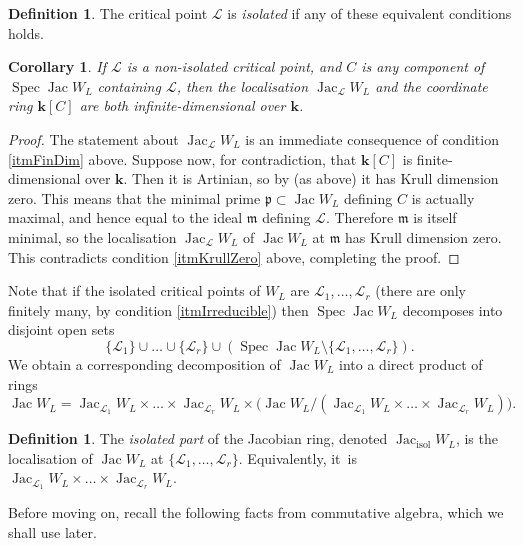 \documentclass[JEP,XML,SOM,Unicode,NoEqCountersInSection,NoFloatCountersInSection,published]{cedram}
\newtheorem{corollary}[theorem]{Corollary}
\theoremstyle{definition}
\newtheorem{definition}[theorem]{Definition}
\newcommand{\calL}{\mathcal{L}}
\newcommand{\kk}{{\boldsymbol{k}}}
\newcommand{\m}{\mathfrak{m}}
\newcommand{\isol}{\mathrm{isol}}
\newcommand{\Spec}{\operatorname{Spec}}
\newcommand{\Jac}{\operatorname{Jac}}
\newcommand{\Jacisol}{\operatorname{Jac}_\isol}
\begin{document}
\begin{definition}
The critical point $\calL$ is \emph{isolated} if any of these equivalent conditions holds.
\end{definition}

\begin{corollary}
\label{corNonIsolated}
If $\calL$ is a non-isolated critical point, and $C$ is any component of $\Spec \Jac W_L$ containing $\calL$, then the localisation $\Jac_\calL W_L$ and the coordinate ring $\kk[C]$ are both infinite-dimensional over $\kk$.
\end{corollary}
\begin{proof}
The statement about $\Jac_\calL W_L$ is an immediate consequence of condition \eqref{itmFinDim} above. Suppose now, for contradiction, that $\kk[C]$ is finite-dimensional over $\kk$. Then it is Artinian, so by \cite[Th.\,8.5]{AtiyahMacdonald} (as above) it has Krull dimension zero. This means that the minimal prime $\mathfrak{p} \subset \Jac W_L$ defining $C$ is actually maximal, and hence equal to the ideal $\m$ defining $\calL$. Therefore $\m$ is itself minimal, so the localisation $\Jac_\calL W_L$ of $\Jac W_L$ at $\m$ has Krull dimension zero. This contradicts condition \eqref{itmKrullZero} above, completing the proof.
\end{proof}

Note that if the isolated critical points of $W_L$ are $\calL_1, \dots, \calL_r$ (there are only finitely many, by condition \eqref{itmIrreducible}) then $\Spec \Jac W_L$ decomposes into disjoint open sets
\[
\{\calL_1\} \cup \dots \cup \{\calL_r\} \cup (\Spec \Jac W_L \setminus \{\calL_1, \dots, \calL_r\}).
\]
We obtain a corresponding decomposition of $\Jac W_L$ into a direct product of rings
\[
\Jac W_L = \Jac_{\calL_1} W_L \times \dots \times \Jac_{\calL_r} W_L \times \bigl(\Jac W_L \big/ (\Jac_{\calL_1} W_L \times \dots \times \Jac_{\calL_r} W_L)\bigr).
\]

\begin{definition}
\label{defSisol}
The \emph{isolated part} of the Jacobian ring, denoted $\Jacisol W_L$, is the localisation of $\Jac W_L$ at $\{\calL_1, \dots, \calL_r\}$. Equivalently, it~is $\Jac_{\calL_1} W_L \times \dots \times \Jac_{\calL_r} W_L$.
\end{definition}

Before moving on, recall the following facts from commutative algebra, which we shall use later.
\end{document}
